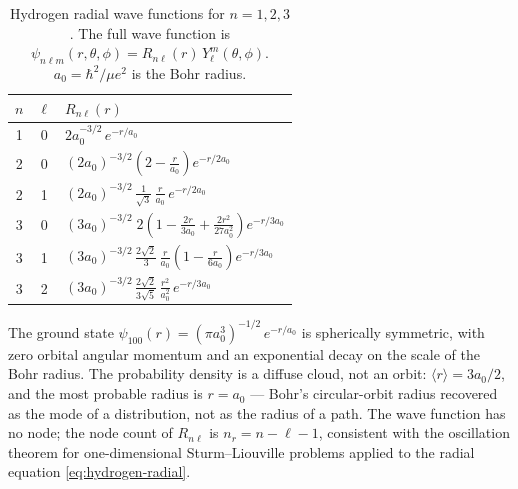 \begin{table}[htbp!]
\centering
\caption{Hydrogen radial wave functions for $n=1,2,3$. The full wave function is $\psi_{n\ell m}(r,\theta,\phi) = R_{n\ell}(r)\,Y_\ell^m(\theta,\phi)$. $a_0 = \hbar^2/\mu e^2$ is the Bohr radius.}
\label{tab:hydrogen-wavefunctions}
\small
\setlength{\tabcolsep}{6pt}
\begin{tabular}{ccl}
\toprule
$n$ & $\ell$ & $R_{n\ell}(r)$ \\
\midrule
1 & 0 & $\displaystyle 2a_0^{-3/2}\,e^{-r/a_0}$ \\[8pt]
2 & 0 & $\displaystyle (2a_0)^{-3/2}\left(2 - \frac{r}{a_0}\right)e^{-r/2a_0}$ \\[8pt]
2 & 1 & $\displaystyle (2a_0)^{-3/2}\,\frac{1}{\sqrt{3}}\,\frac{r}{a_0}\,e^{-r/2a_0}$ \\[8pt]
3 & 0 & $\displaystyle (3a_0)^{-3/2}\;2\left(1 - \frac{2r}{3a_0} + \frac{2r^2}{27a_0^2}\right)e^{-r/3a_0}$ \\[8pt]
3 & 1 & $\displaystyle (3a_0)^{-3/2}\,\frac{2\sqrt{2}}{3}\,\frac{r}{a_0}\left(1 - \frac{r}{6a_0}\right)e^{-r/3a_0}$ \\[8pt]
3 & 2 & $\displaystyle (3a_0)^{-3/2}\,\frac{2\sqrt{2}}{3\sqrt{5}}\,\frac{r^2}{a_0^2}\,e^{-r/3a_0}$ \\
\bottomrule
\end{tabular}
\end{table}

The ground state $\psi_{100}(r) = (\pi a_0^3)^{-1/2}\,e^{-r/a_0}$ is spherically symmetric, with zero orbital angular momentum and an exponential decay on the scale of the Bohr radius. The probability density is a diffuse cloud, not an orbit: $\langle r\rangle = 3a_0/2$, and the most probable radius is $r = a_0$ --- Bohr's circular-orbit radius recovered as the mode of a distribution, not as the radius of a path. The wave function has no node; the node count of $R_{n\ell}$ is $n_r = n-\ell-1$, consistent with the oscillation theorem for one-dimensional Sturm--Liouville problems applied to the radial equation \eqref{eq:hydrogen-radial}.

